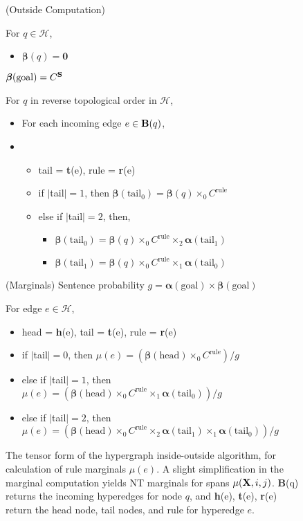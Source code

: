\documentclass[11pt]{article}
\newcommand{\bS}{{\bf S}}
\newcommand{\bX}{{\bf X}}
\newcommand{\balpha}{\bm{\alpha}}
\newcommand{\bbeta}{\bm{\beta}}
\begin{document}
\begin{figure}[h!]
\begin{footnotesize}
{{				
		(Outside Computation)
				
		For $q \in \mathcal{H}$,
		\begin{itemize}[label={},nolistsep]
			\item $\bbeta(q) = \bm{0}$
		\end{itemize}
		$\bbeta(\textrm{goal}) = C^\bS$
		
		For $q$ in reverse topological order in $\mathcal{H}$,
		\begin{itemize}[label={},nolistsep]
			\item For each incoming edge $e \in {\bf B}(q)$,
			\item \begin{itemize}[label={}]
				\item tail = {\bf t}(e), rule = {\bf r}(e)
				\item if $|$tail$| = 1$, then $\bbeta(\textrm{tail}_0) = \bbeta(q) \times_0 C^{\textrm{rule}}$
				\item else if $|$tail$| = 2$, then,
					\begin{itemize}[label={}]
						\item $\bbeta(\textrm{tail}_0) = \bbeta(q) \times_0 C^{\textrm{rule}} \times_2 \balpha(\textrm{tail}_1)$
						\item $\bbeta(\textrm{tail}_1) = \bbeta(q) \times_0 C^{\textrm{rule}} \times_1 \balpha(\textrm{tail}_0)$						
					\end{itemize}

			\end{itemize}
		\end{itemize}
			

		\hbox{(Marginals)}
		Sentence probability $g = \balpha(\textrm{goal}) \times \bbeta(\textrm{goal})$
		
		For edge $e \in \mathcal{H}$, 
			\begin{itemize}[label={},nolistsep]
					\item head = {\bf h}(e), tail = {\bf t}(e), rule = {\bf r}(e)
					\item if $|$tail$| = 0$, then $\mu(e) = (\bbeta(\textrm{head}) \times_0 C^{\textrm{rule}}) / g$
					\item else if $|$tail$| = 1$, then $\mu(e) = (\bbeta(\textrm{head}) \times_0 C^{\textrm{rule}} \times_1 \balpha(\textrm{tail}_0)) / g$
					\item else if $|$tail$| = 2$, then $\mu(e) = (\bbeta(\textrm{head}) \times_0 C^{\textrm{rule}} \times_2 \balpha(\textrm{tail}_1) \times_1 \balpha(\textrm{tail}_0)) / g$					
			\end{itemize}
}}
\end{footnotesize}
\caption{The tensor form of the hypergraph inside-outside algorithm, for calculation of rule marginals $\mu(e)$.  
A slight simplification in the marginal computation yields NT marginals for spans $\mu(\bX, i, j)$.
{\bf B}(q) returns the incoming hyperedges for node $q$, and {\bf h}(e), {\bf t}(e), {\bf r}(e) return the head node, tail nodes, and rule for hyperedge $e$.} 
\vspace{-0.8cm}
\label{fig:hg_io_spec}
\end{figure}
\end{document}
